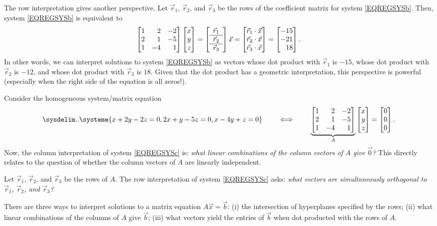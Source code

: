 The row interpretation gives another perspective. Let $\vec r_1$, $\vec r_2$, and $\vec r_3$ be the rows of the coefficient matrix
for system \eqref{EQREGSYSb}. Then, system \eqref{EQREGSYSb} is equivalent to
\[
	\mat{1&2&-2\\2&1&-5\\1&-4&1}\mat{x\\y\\z}=
	\left[\begin{array}{c}\vec r_1\\\hline\vec r_2\\\hline\vec r_3\end{array}\right]\vec x=
	\mat{\vec r_1\cdot \vec x\\\vec r_2\cdot\vec x\\\vec r_3\cdot \vec x}
	     =\mat{-15\\-21\\18}.
\]
In other words, we can interpret solutions to system \eqref{EQREGSYSb} as vectors whose dot product
with $\vec r_1$ is $-15$, whose dot product with $\vec r_2$ is $-12$, and whose dot product with
$\vec r_3$ is $18$. Given that the dot product has a geometric interpretation, this perspective is powerful
(especially when the right side of the equation is all zeros!).

Consider the homogeneous system/matrix equation
\begin{equation}
	\label{EQREGSYSc}
	\sysdelim..
		\systeme{
			x+2y-2z=0,
			2x+y-5z=0,
			x-4y+z=0
		}
		\qquad\iff\qquad
		\underbrace{\mat{1&2&-2\\2&1&-5\\1&-4&1}}_A\mat{x\\y\\z}=\mat{0\\0\\0}
		.
\end{equation}
Now, the column interpretation of system \eqref{EQREGSYSc} is: \emph{what linear combinations of the column vectors
of $A$ give $\vec 0$?} This directly relates to the question of whether the column vectors of $A$ are linearly independent.

Let $\vec r_1$, $\vec r_2$, and $\vec r_3$ be the rows of $A$. The row interpretation of system \eqref{EQREGSYSc} asks:
\emph{what vectors are simultaneously orthogonal to $\vec r_1$, $\vec r_2$, and $\vec r_3$?}

\begin{emphbox}[Takeaway]
	There are three ways to interpret solutions to a matrix equation $A\vec x=\vec b$: (i) the intersection of hyperplanes
	specified by the rows; (ii) what linear combinations of the columns of $A$ give $\vec b$; (iii) what vectors yield
	the entries of $\vec b$ when dot producted with the rows of $A$.
\end{emphbox}

